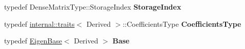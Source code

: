 \begin{DoxyCompactItemize}
typedef Dense\+Matrix\+Type\+::\+Storage\+Index {\bfseries Storage\+Index}
\item 
\mbox{\label{class_eigen_1_1internal_1_1_band_matrix_base_a17c354627a5d45343b09ed4254b2871c}} 
typedef \hyperlink{struct_eigen_1_1internal_1_1traits}{internal\+::traits}$<$ Derived $>$\+::Coefficients\+Type {\bfseries Coefficients\+Type}
\item 
\mbox{\label{class_eigen_1_1internal_1_1_band_matrix_base_af06810be4827bc9268e0d02fea6b4e62}} 
typedef \hyperlink{group___core___module_struct_eigen_1_1_eigen_base}{Eigen\+Base}$<$ Derived $>$ {\bfseries Base}
\end{DoxyCompactItemize}
